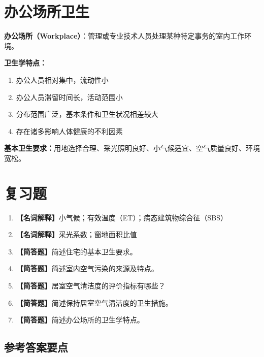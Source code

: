 \documentclass[10pt,a4paper,oneside]{ctexbook}
\begin{document}
\section{办公场所卫生}

\begin{defbox}
\textbf{办公场所（Workplace）}：管理或专业技术人员处理某种特定事务的室内工作环境。
\end{defbox}

\textbf{卫生学特点：}
\begin{enumerate}[leftmargin=*]
    \item 办公人员相对集中，流动性小
    \item 办公人员滞留时间长，活动范围小
    \item 分布范围广泛，基本条件和卫生状况相差较大
    \item 存在诸多影响人体健康的不利因素
\end{enumerate}

\textbf{基本卫生要求：}用地选择合理、采光照明良好、小气候适宜、空气质量良好、环境宽松。

\section{复习题}

\begin{enumerate}[leftmargin=*, itemsep=8pt]
    \item \textbf{【名词解释】}小气候；有效温度（ET）；病态建筑物综合征（SBS）
    \item \textbf{【名词解释】}采光系数；窗地面积比值
    \item \textbf{【简答题】}简述住宅的基本卫生要求。
    \item \textbf{【简答题】}简述室内空气污染的来源及特点。
    \item \textbf{【简答题】}居室空气清洁度的评价指标有哪些？
    \item \textbf{【简答题】}简述保持居室空气清洁度的卫生措施。
    \item \textbf{【简答题】}简述办公场所的卫生学特点。
\end{enumerate}

\subsection*{参考答案要点}
\end{document}
